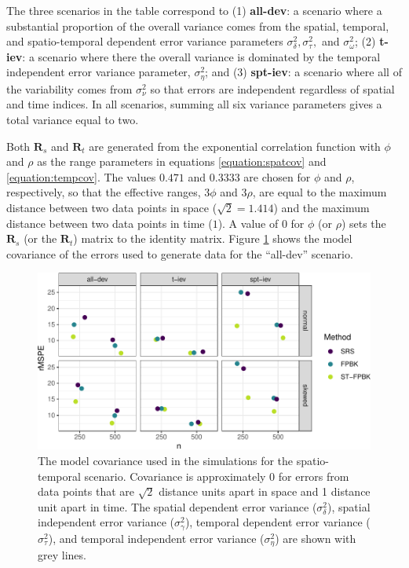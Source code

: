 \documentclass[smallextended]{svjour3}       %
\begin{document}
The three scenarios in the table correspond to (1) \textbf{all-dev}: a
scenario where a substantial proportion of the overall variance comes
from the spatial, temporal, and spatio-temporal dependent error variance
parameters \(\sigma^2_{\delta}, \sigma^2_{\tau},\) and
\(\sigma^2_{\omega}\); (2) \textbf{t-iev}: a scenario where there the
overall variance is dominated by the temporal independent error variance
parameter, \(\sigma^2_{\eta}\); and (3) \textbf{spt-iev}: a scenario
where all of the variability comes from \(\sigma^2_{\nu}\) so that
errors are independent regardless of spatial and time indices. In all
scenarios, summing all six variance parameters gives a total variance
equal to two.

Both \(\mathbf{R}_{s}\) and \(\mathbf{R}_t\) are generated from the
exponential correlation function with \(\phi\) and \(\rho\) as the range
parameters in equations \ref{equation:spatcov} and
\ref{equation:tempcov}. The values \(0.471\) and \(0.3333\) are chosen
for \(\phi\) and \(\rho\), respectively, so that the effective ranges,
\(3 \phi\) and \(3 \rho\), are equal to the maximum distance between two
data points in space (\(\sqrt2 = 1.414\)) and the maximum distance
between two data points in time (\(1\)). A value of 0 for \(\phi\) (or
\(\rho\)) sets the \(\mathbf{R}_{s}\) (or the \(\mathbf{R}_t\)) matrix
to the identity matrix. Figure \ref{fig:simcovplot} shows the model
covariance of the errors used to generate data for the ``all-dev''
scenario.

\begin{figure}
\centering
\includegraphics{preprint_springer_files/figure-latex/unnamed-chunk-17-1.pdf}
\caption{\label{fig:simcovplot} The model covariance used in the
simulations for the spatio-temporal scenario. Covariance is
approximately 0 for errors from data points that are \(\sqrt2\) distance
units apart in space and 1 distance unit apart in time. The spatial
dependent error variance (\(\sigma^2_{\delta}\)), spatial independent
error variance (\(\sigma^2_{\gamma}\)), temporal dependent error
variance (\(\sigma^2_{\tau}\)), and temporal independent error variance
(\(\sigma^2_{\eta}\)) are shown with grey lines.}
\end{figure}
\end{document}
